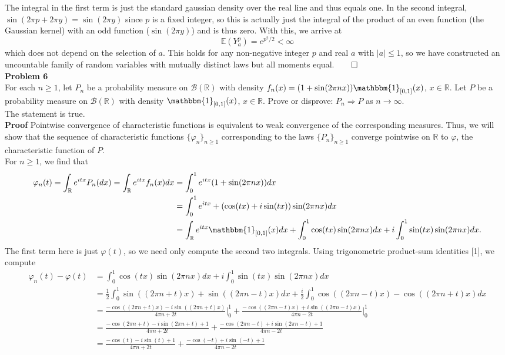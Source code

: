 \documentclass[10pt]{article}
\newcommand{\E}{\mathbb{E}}
\newcommand{\mbb}[1]{\mathbb{#1}}
\newcommand{\1}[1]{\mathbbm{1}_{#1}}
\newcommand{\mc}[1]{\mathcal{#1}}
\begin{document}
    The integral in the first term is just the standard gaussian density over the real line and thus equals one. In the second integral, $\sin(2\pi p+2\pi y)=\sin(2\pi y)$ since $p$ is a fixed integer, so this is actually just the integral of the product of an even function (the Gaussian kernel) with an odd function ($\sin(2\pi y)$) and is thus zero. With this, we arrive at
    \[\E{(Y_a^p)}=e^{p^2/2}<\infty\]
    which does not depend on the selection of $a$. This holds for any non-negative integer $p$ and real $a$ with $|a|\leq 1$, so we have constructed an uncountable family of random variables with mutually distinct laws but all moments equal.\hfill{$\qed$}\\[5pt]
    {\bf Problem 6}\\[5pt]
    For each $n\geq 1$, let $P_n$ be a probability measure on $\mc{B}(\mbb{R})$ with density $f_n(x)=(1+\sin(2\pi nx))\1{[0,1]}(x)$, $x\in\mbb{R}$. Let $P$ be a probability measure on $\mc{B}(\mbb{R})$ with density $\1{[0,1]}(x)$, $x\in\mbb{R}$. Prove or disprove: $P_n\Longrightarrow P$ as $n\rightarrow\infty$.\\[5pt]
    The statement is true.\\[5pt]
    {\bf Proof}\hspace{5pt} Pointwise convergence of characteristic functions is equivalent to weak convergence of the corresponding measures. Thus, we will show that the sequence of characteristic functions $\{\varphi_n\}_{n\geq 1}$ corresponding to the laws $\{P_n\}_{n\geq 1}$ converge pointwise on $\mbb{R}$ to $\varphi$, the characteristic function of $P$.\\[5pt]
    For $n\geq 1$, we find that
    \begin{align*}
        \varphi_n(t)=\int_\mbb{R}e^{itx}P_n(dx)=\int_\mbb{R}e^{itx}f_n(x)dx&=\int_0^1e^{itx}(1+\sin(2\pi nx))dx\\
        &=\int_0^1e^{itx}+(\cos(tx)+i\sin(tx))\sin(2\pi nx)dx\\
        &=\int_\mbb{R}e^{itx}\1{[0,1]}(x)dx+\int_0^1\cos(tx)\sin(2\pi nx)dx+i\int_0^1\sin(tx)\sin(2\pi nx)dx.
    \end{align*}
    The first term here is just $\varphi(t)$, so we need only compute the second two integrals. Using trigonometric product-sum identities [1], we compute
    \begin{align*}
        \varphi_n(t)-\varphi(t)&=\int_0^1\cos(tx)\sin(2\pi nx)dx+i\int_0^1\sin(tx)\sin(2\pi nx)dx\\
        &=\frac{1}{2}\int_0^1\sin((2\pi n+t)x)+\sin((2\pi n-t)x)dx+\frac{i}{2}\int_0^1\cos((2\pi n-t)x)-\cos((2\pi n+t)x)dx\\
        &=\frac{-\cos((2\pi n+t)x)-i\sin((2\pi n+t)x)}{4\pi n+2t}\bigg|_0^1+\frac{-\cos((2\pi n-t)x)+i\sin((2\pi n -t)x)}{4\pi n-2t}\bigg|_0^1\\
        &=\frac{-\cos(2\pi n+t)-i\sin(2\pi n+t)+1}{4\pi n+2t}+\frac{-\cos(2\pi n-t)+i\sin(2\pi n -t)+1}{4\pi n-2t}\\
        &=\frac{-\cos(t)-i\sin(t)+1}{4\pi n+2t}+\frac{-\cos(-t)+i\sin(-t)+1}{4\pi n-2t}
    \end{align*}
\end{document}
